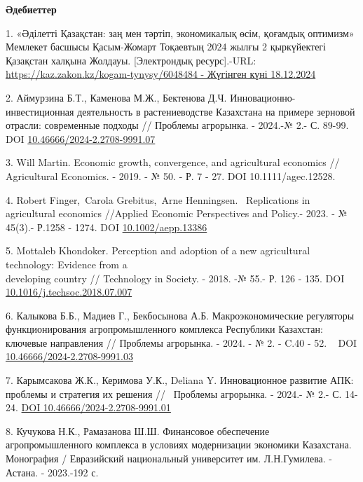 \begin{center}
{\bfseries Әдебиеттер}
\end{center}

\begin{references}
1. «Әділетті Қазақстан: заң мен тәртіп, экономикалық өсім, қоғамдық
оптимизм» Мемлекет басшысы Қасым-Жомарт Тоқаевтың 2024 жылғы 2
қыркүйектегі Қазақстан халқына Жолдауы. {[}Электрондық ресурс{]}.-URL:
\href{https://kaz.zakon.kz/kogam-tynysy/6048484\%20-\%2018.12.2024}{https://kaz.zakon.kz/kogam-tynysy/6048484
- Жүгінген күні 18.12.2024}

2. Аймурзина Б.Т., Каменова М.Ж., Бектенова Д.Ч.
Инновационно-инвестиционная деятельность в растениеводстве Казахстана на
примере зерновой отрасли: современные подходы // Проблемы агрорынка. -
2024.-№ 2.- С. 89-99. DOI
\href{https://doi.org/10.46666/2024-2.2708-9991.07}{10.46666/2024-2.2708-9991.07}

3. Will Martin. Economic growth, convergence, and agricultural economics
// Agricultural Economics. - 2019. - № 50. - Р. 7 - 27. DOI
10.1111/agec.12528.

4. Robert Finger,~Carola Grebitus,~Arne Henningsen. ~Replications in
agricultural economics //Applied Economic Perspectives and Policy.-
2023. - № 45(3).- Р.1258 - 1274.
DOI \href{https://doi.org/10.1002/aepp.13386}{10.1002/aepp.13386}

5. Mottaleb Khondoker. Perception and adoption of a new agricultural
technology: Evidence from a \\developing country // Technology in Society.
- 2018. -№ 55.- Р. 126 - 135.
DOI \\\href{http://dx.doi.org/10.1016/j.techsoc.2018.07.007}{10.1016/j.techsoc.2018.07.007}

6. Калыкова Б.Б., Мадиев Г., Бекбосынова А.Б. Макроэкономические
регуляторы функционирования агропромышленного комплекса Республики
Казахстан: ключевые направления // Проблемы агрорынка. - 2024. - № 2. -
C.40 - 52. ~ DOI
\href{https://doi.org/10.46666/2024-2.2708-9991.03}{10.46666/2024-2.2708-9991.03}

7. Карымсакова Ж.К., Керимова У.К., Deliana Y. Инновационное развитие
АПК: проблемы и стратегия их решения // ~Проблемы агрорынка. - 2024.- №
2.- С. 14-24. \href{https://doi.org/10.46666/2024-2.2708-9991.01}{DOI
10.46666/2024-2.2708-9991.01}

8. Кучукова Н.К., Рамазанова Ш.Ш. Финансовое обеспечение
агропромышленного комплекса в условиях модернизации экономики
Казахстана. Монография / Евразийский национальный университет им.
Л.Н.Гумилева. - Астана. - 2023.-192 с.


\end{references}
